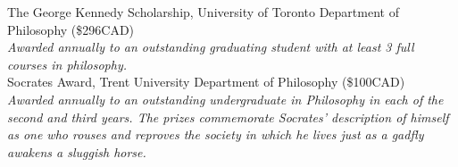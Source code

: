 \documentclass[10pt]{article}
\newcommand{\years}[1]{\marginnote{\scriptsize #1}}
\begin{document}
\years{2015}The George Kennedy Scholarship, University of Toronto Department of Philosophy (\$296CAD) \\
\emph{Awarded annually to an outstanding graduating student with at least 3 full courses in philosophy.} \\
\years{2012}Socrates Award, Trent University Department of Philosophy (\$100CAD) \\
\emph{Awarded annually to an outstanding undergraduate in Philosophy in each of the second and third years. The prizes commemorate Socrates' description of himself as one who rouses and reproves the society in which he lives just as a gadfly awakens a sluggish horse.}




\end{document}
